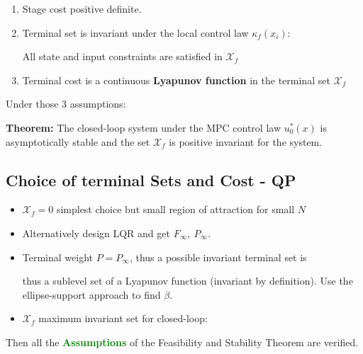 \documentclass[8pt,a4paper]{scrartcl}
\begin{document}
\begin{multicols*}{3}
\begin{multicols*}{4}
\begin{enumerate}
\item Stage cost positive definite.
\item Terminal set is invariant under the local control law $\kappa_f(x_i)$:


All state and input constraints are satisfied in $\mathcal{X}_f$

\item Terminal cost is a continuous \textbf{Lyapunov function} in the terminal set $\mathcal{X}_f$

\end{enumerate}

Under those 3 assumptions:

\textbf{Theorem:} The closed-loop system under the MPC control law $u_0^\ast(x)$ is asymptotically stable and the set $\mathcal{X}_f$ is positive invariant for the system.

\subsection{Choice of terminal Sets and Cost - QP}

\begin{itemize}
\item $\mathcal{X}_f=0$ simplest choice but small region of attraction for small $N$
\item Alternatively design LQR and get $F_\infty,\ P_\infty$.

\item Terminal weight $P=P_\infty$, thus a possible invariant terminal set is 


thus a sublevel set of a Lyapunov function (invariant by definition). Use the ellipse-support approach to find $\beta$.

\item $\mathcal{X}_f$ \dahe maximum invariant set for closed-loop:

\end{itemize}

Then all the \textcolor{green}{\textbf{Assumptions}} of the Feasibility and Stability Theorem are verified.


\end{multicols*}
\end{multicols*}
\end{document}
